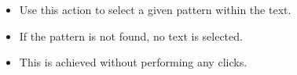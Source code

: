 \begin{itemize}
\item Use this action to select a given pattern within the text.
\item  If the pattern is not found, no text is selected.
\item This is achieved without performing any clicks. 
\end{itemize}
